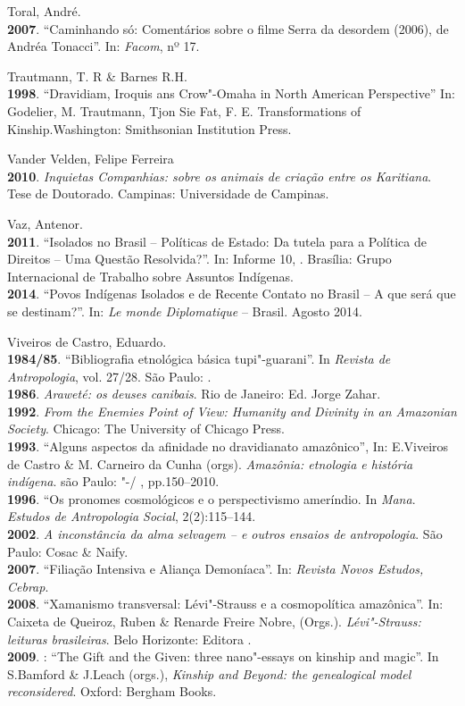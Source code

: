\begin{Parskip}
Toral, André.\\
\textbf{2007}. ``Caminhando só: Comentários sobre o filme Serra da
desordem (2006), de Andréa Tonacci''. In: \emph{Facom}, nº 17.

Trautmann, T. R \& Barnes R.H.\\
\textbf{1998}. ``Dravidiam, Iroquis ans Crow"-Omaha in North American
Perspective'' In: Godelier, M. Trautmann, Tjon Sie Fat, F. E.
Transformations of Kinship.Washington: Smithsonian Institution Press.

Vander Velden, Felipe Ferreira\\
\textbf{2010}. \emph{Inquietas Companhias: sobre os animais de criação
entre os Karitiana}. Tese de Doutorado. Campinas: Universidade de
Campinas.

Vaz, Antenor.\\
\textbf{2011}. ``Isolados no Brasil -- Políticas de Estado: Da tutela
para a Política de Direitos -- Uma Questão Resolvida?''. In: Informe 10,
. Brasília: Grupo Internacional de Trabalho sobre Assuntos
Indígenas.\\
\textbf{2014}. ``Povos Indígenas Isolados e de Recente Contato no Brasil
-- A que será que se destinam?''. In: \emph{Le monde Diplomatique} --
Brasil. Agosto 2014.

Viveiros de Castro, Eduardo.\\
\textbf{1984/85}. ``Bibliografia etnológica básica tupi"-guarani''. In
\emph{Revista de Antropologia}, vol. 27/28. São Paulo: .\\
\textbf{1986}. \emph{Araweté: os deuses canibais}. Rio de Janeiro: Ed. Jorge
Zahar.\\
\textbf{1992}. \emph{From the Enemies Point of View: Humanity and
Divinity in an Amazonian Society}. Chicago: The University of Chicago
Press.\\
\textbf{1993}. ``Alguns aspectos da afinidade no dravidianato amazônico'',
In: E.Viveiros de Castro \& M. Carneiro da Cunha (orgs). \emph{Amazônia:
etnologia e história indígena}. são Paulo: "-/ ,
pp.150--2010.\\
\textbf{1996}. ``Os pronomes cosmológicos e o perspectivismo ameríndio.
In \emph{Mana}. \emph{Estudos de Antropologia Social}, 2(2):115--144.\\
\textbf{2002}. \emph{A inconstância da alma selvagem -- e outros ensaios
de antropologia}. São Paulo: Cosac \& Naify.\\
\textbf{2007}. ``Filiação Intensiva e Aliança Demoníaca''. In:
\emph{Revista Novos Estudos, Cebrap}.\\
\textbf{2008}. ``Xamanismo transversal: Lévi"-Strauss e a cosmopolítica
amazônica''. In: Caixeta de Queiroz, Ruben \& Renarde Freire Nobre,
(Orgs.). \emph{Lévi"-Strauss: leituras brasileiras}. Belo Horizonte:
Editora .\\
\textbf{2009}. : ``The Gift and the Given: three nano"-essays on kinship
and magic''. In S.Bamford \& J.Leach (orgs.), \emph{Kinship and Beyond:
the genealogical model reconsidered}. Oxford: Bergham Books.


\end{Parskip}
